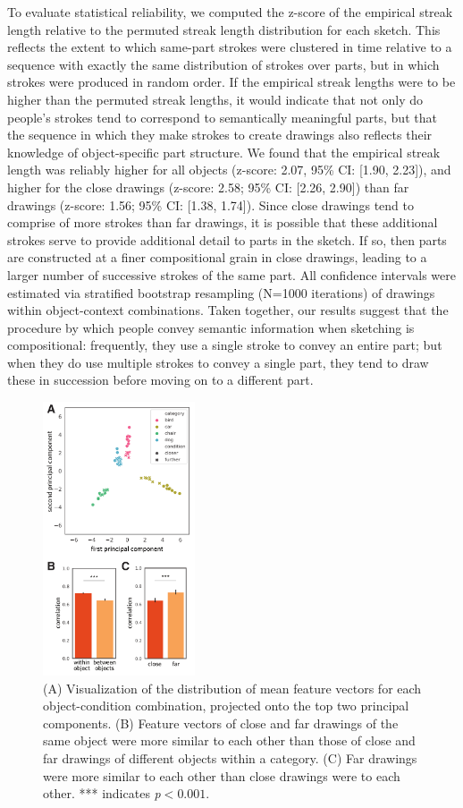 \documentclass[10pt,letterpaper]{article}
\begin{document}
To evaluate statistical reliability, we computed the z-score of the empirical streak length relative to the permuted streak length distribution for each sketch. 
This reflects the extent to which same-part strokes were clustered in time relative to a sequence with exactly the same distribution of strokes over parts, but in which strokes were produced in random order. If the empirical streak lengths were to be higher than the permuted streak lengths, it would indicate that not only do people's strokes tend to correspond to semantically meaningful parts, but that the sequence in which they make strokes to create drawings also reflects their knowledge of object-specific part structure. 
We found that the empirical streak length was reliably higher for all objects (z-score: 2.07, 95\% CI: [1.90, 2.23]), and higher for the close drawings (z-score: 2.58; 95\% CI: [2.26, 2.90]) than far drawings (z-score: 1.56; 95\% CI: [1.38, 1.74]).
Since close drawings tend to comprise of more strokes than far drawings, it is possible that these additional strokes serve to provide additional detail to parts in the sketch. If so, then parts are constructed at a finer compositional grain in close drawings, leading to a larger number of successive strokes of the same part.
All confidence intervals were estimated via stratified bootstrap resampling (N=1000 iterations) of drawings within object-context combinations.
Taken together, our results suggest that the procedure by which people convey semantic information when sketching is compositional: frequently, they use a single stroke to convey an entire part; but when they do use multiple strokes to convey a single part, they tend to draw these in succession before moving on to a different part. 

\begin{figure}[ht]
\centering
\includegraphics[width=0.4\textwidth]{figures/7_part_emphasis.pdf}
\caption{(A) Visualization of the distribution of mean feature vectors for each object-condition combination, projected onto the top two principal components. (B) Feature vectors of close and far drawings of the same object were more similar to each other than those of close and far drawings of different objects within a category. (C) Far drawings were more similar to each other than close drawings were to each other. *** indicates \textit{p}$<0.001.$}
\label{part_emphasis}
\end{figure}
\end{document}
